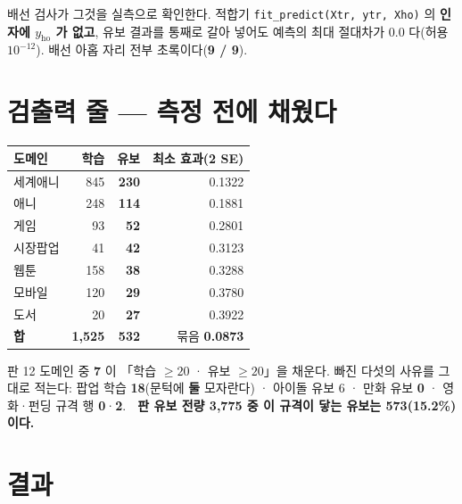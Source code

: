 \documentclass[10pt]{article}
\begin{document}
배선 검사가 그것을 실측으로 확인한다. 적합기 \texttt{fit\_predict(Xtr, ytr, Xho)} 의
\textbf{인자에 $y_{\mathrm{ho}}$ 가 없고}, 유보 결과를 통째로 갈아 넣어도 예측의
최대 절대차가 \textbf{$0.0$} 다(허용 $10^{-12}$). 배선 아홉 자리 전부 초록이다(\textbf{9 / 9}).

\section{검출력 줄 --- 측정 전에 채웠다}

\begin{center}\tsize
\begin{tabular}{lrrr}
\toprule
도메인 & 학습 & \textbf{유보} & 최소 효과(2 SE) \\
\midrule
세계애니 & 845 & \textbf{230} & 0.1322 \\
애니 & 248 & \textbf{114} & 0.1881 \\
게임 & 93 & \textbf{52} & 0.2801 \\
시장팝업 & 41 & \textbf{42} & 0.3123 \\
웹툰 & 158 & \textbf{38} & 0.3288 \\
모바일 & 120 & \textbf{29} & 0.3780 \\
도서 & 20 & \textbf{27} & 0.3922 \\
\midrule
\textbf{합} & \textbf{1{,}525} & \textbf{532} & 묶음 \textbf{0.0873} \\
\bottomrule
\end{tabular}
\end{center}

판 12 도메인 중 \textbf{7} 이 「학습 $\ge 20$ · 유보 $\ge 20$」을 채운다.
빠진 다섯의 사유를 그대로 적는다: 팝업 학습 \textbf{18}(문턱에 \textbf{둘} 모자란다) ·
아이돌 유보 6 · 만화 유보 \textbf{0} · 영화·펀딩 규격 행 \textbf{0}·\textbf{2}.
🔴 \textbf{판 유보 전량 3{,}775 중 이 규격이 닿는 유보는 573(15.2\%)이다.}

\section{결과}

\end{document}
